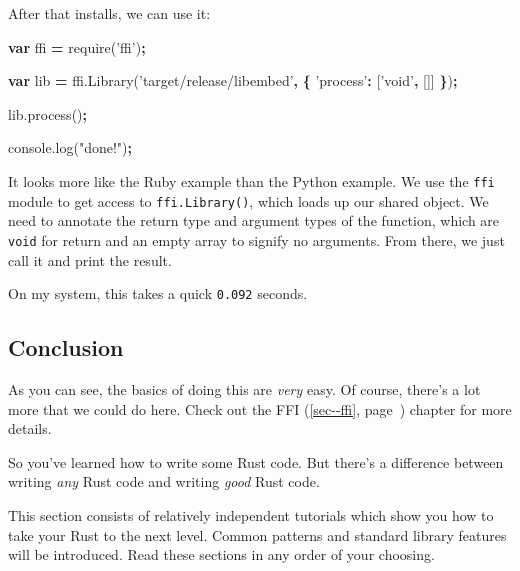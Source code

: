 \documentclass[a4paper,]{book}
\renewcommand*{\hyperref}[2][\ar]{%
  \def\ar{#2}%
  #2 (\autoref{#1}, page~\pageref{#1})}
\newenvironment{Shaded}{\begin{snugshade}}{\end{snugshade}}
\newcommand{\KeywordTok}[1]{\textcolor[rgb]{0.13,0.29,0.53}{\textbf{{#1}}}}
\newcommand{\StringTok}[1]{\textcolor[rgb]{0.31,0.60,0.02}{{#1}}}
\newcommand{\VariableTok}[1]{\textcolor[rgb]{0.00,0.00,0.00}{{#1}}}
\newcommand{\OperatorTok}[1]{\textcolor[rgb]{0.81,0.36,0.00}{\textbf{{#1}}}}
\newcommand{\AttributeTok}[1]{\textcolor[rgb]{0.77,0.63,0.00}{{#1}}}
\newcommand{\NormalTok}[1]{{#1}}
\begin{document}
After that installs, we can use it:

\begin{Shaded}
\begin{Highlighting}[]
\KeywordTok{var} \NormalTok{ffi }\OperatorTok{=} \AttributeTok{require}\NormalTok{(}\StringTok{'ffi'}\NormalTok{)}\OperatorTok{;}

\KeywordTok{var} \NormalTok{lib }\OperatorTok{=} \VariableTok{ffi}\NormalTok{.}\AttributeTok{Library}\NormalTok{(}\StringTok{'target/release/libembed'}\OperatorTok{,} \OperatorTok{\{}
  \StringTok{'process'}\OperatorTok{:} \NormalTok{[}\StringTok{'void'}\OperatorTok{,} \NormalTok{[]]}
\OperatorTok{\}}\NormalTok{)}\OperatorTok{;}

\VariableTok{lib}\NormalTok{.}\AttributeTok{process}\NormalTok{()}\OperatorTok{;}

\VariableTok{console}\NormalTok{.}\AttributeTok{log}\NormalTok{(}\StringTok{"done!"}\NormalTok{)}\OperatorTok{;}
\end{Highlighting}
\end{Shaded}

It looks more like the Ruby example than the Python example. We use the
\texttt{ffi} module to get access to \texttt{ffi.Library()}, which loads
up our shared object. We need to annotate the return type and argument
types of the function, which are \texttt{void} for return and an empty
array to signify no arguments. From there, we just call it and print the
result.

On my system, this takes a quick \texttt{0.092} seconds.

\subsection{Conclusion}\label{conclusion}

As you can see, the basics of doing this are \emph{very} easy. Of
course, there's a lot more that we could do here. Check out the
\hyperref[sec--ffi]{FFI} chapter for more details.


So you've learned how to write some Rust code. But there's a difference
between writing \emph{any} Rust code and writing \emph{good} Rust code.

This section consists of relatively independent tutorials which show you
how to take your Rust to the next level. Common patterns and standard
library features will be introduced. Read these sections in any order of
your choosing.
\end{document}
